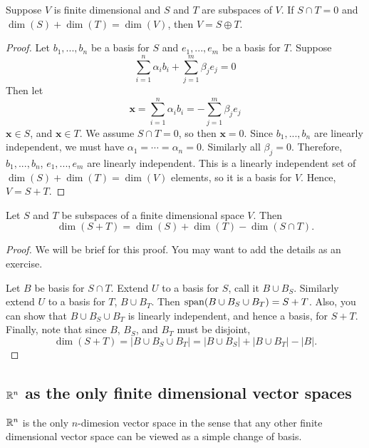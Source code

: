 \begin{lemma}\label{lem:dimisect}
  Suppose $V$ is finite dimensional and $S$ and $T$ are subspaces of
  $V$. If $S \cap T = 0$ and $\dim(S) + \dim(T) = \dim(V)$, then $V =
  S \oplus T$. 
\end{lemma}
\begin{proof}
  Let $b_1, ..., b_n$ be a basis for $S$ and $e_1, ..., e_m$ be a
  basis for $T$. Suppose 
  \[ \sum_{i=1}^n \alpha_i b_i +  \sum_{j=1}^m \beta_j e_j = 0 \]
  Then let
  \[ \mathbf{x} = \sum_{i=1}^n \alpha_i b_i = -\sum_{j=1}^m \beta_j
  e_j \]
  $\mathbf{x} \in S$, and $\mathbf{x} \in T$. We assume $S \cap T =
  0$, so then $\mathbf{x} = 0$. Since $b_1, ..., b_n$ are linearly
  independent, we must have $\alpha_1 = \cdots = \alpha_n =
  0$. Similarly all $\beta_j = 0$. Therefore, $b_1, ..., b_n$, $e_1,
  ..., e_m$ are linearly independent. This is a linearly independent
  set of $\dim(S) + \dim(T) = \dim(V)$ elements, so it is a basis for
  $V$. Hence, $V = S + T$. 
\end{proof}
\begin{lemma}\label{lem:dimSum}
  Let $S$ and $T$ be subspaces of a finite dimensional space $V$. Then
  \[ \dim(S + T) = \dim(S) + \dim(T) - \dim(S \cap T). \]
\end{lemma}
\begin{proof}
  We will be brief for this proof. You may want to add the details as
  an exercise. 
  
  Let $B$ be basis for $S \cap T$. Extend $U$ to a basis for $S$, call
  it $B \cup B_S$. Similarly extend $U$ to a basis for $T$, $B\cup
  B_T$. Then $\mathrm{span}(B \cup B_S \cup B_T) = S + T$. Also, you can show
  that $B \cup B_S \cup B_T$ is linearly independent, and hence a
  basis, for $S+T$. Finally, note that since $B$, $B_S$, and $B_T$ must
  be disjoint, 
  \[ \dim(S+T) = | B \cup B_S \cup B_T | = | B \cup B_S | + | B \cup
  B_T | - | B |. \]
\end{proof}

\subsection{$\mathbb{R}^n$ as the  only finite dimensional vector spaces}

$\mathbb{R}^n$ is the only $n$-dimesion vector space in the sense that any
other finite dimensional vector space can be viewed as a simple change
of basis.

